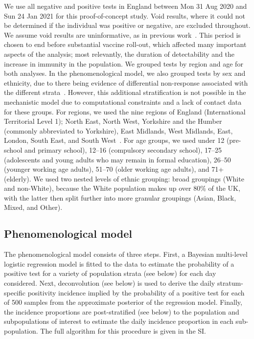 \documentclass[9pt,twocolumn,twoside]{pnas-new}
\begin{document}
{We use all negative and positive tests in England between Mon 31 Aug 2020 and Sun 24 Jan 2021 for this proof-of-concept study.
Void results, where it could not be determined if the individual was positive or negative, are excluded throughout.
We assume void results are uninformative, as in previous work~\citep{pritchardDetecting}.
This period is chosen to end before substantial vaccine roll-out, which affected many important aspects of the analysis; most relevantly, the duration of detectability and the increase in immunity in the population.
We grouped tests by region and age for both analyses.
In the phenomenological model, we also grouped tests by sex and ethnicity, due to there being evidence of differential non-response associated with the different strata~\citep{pouwelsCommunity}.
However, this additional stratification is not possible in the mechanistic model due to computational constraints and a lack of contact data for these groups.
For regions, we used the nine regions of England (International Territorial Level 1); North East, North West, Yorkshire and the Humber (commonly abbreviated to Yorkshire), East Midlands, West Midlands, East, London, South East, and South West~\citep{onsRegions}.
For age groups, we used under 12 (pre-school and primary school), 12--16 (compulsory secondary school), 17--25 (adolescents and young adults who may remain in formal education), 26--50 (younger working age adults), 51--70 (older working age adults), and 71+ (elderly).
We used two nested levels of ethnic grouping: broad groupings (White and non-White), because the White population makes up over 80\% of the UK, with the latter then split further into more granular groupings (Asian, Black, Mixed, and Other).


\subsection*{Phenomenological model}\label{sec:MMphenom}
The phenomenological model consists of three steps.
First, a Bayesian multi-level logistic regression model is fitted to the data to estimate the probability of a positive test for a variety of population strata (see below) for each day considered.
Next, deconvolution (see below) is used to derive the daily stratum-specific positivity incidence implied by the probability of a positive test for each of 500 samples from the approximate posterior of the regression model.
Finally, the incidence proportions are post-stratified (see below) to the population and subpopulations of interest to estimate the daily incidence proportion in each sub-population.
The full algorithm for this procedure is given in the SI.

}
\end{document}
